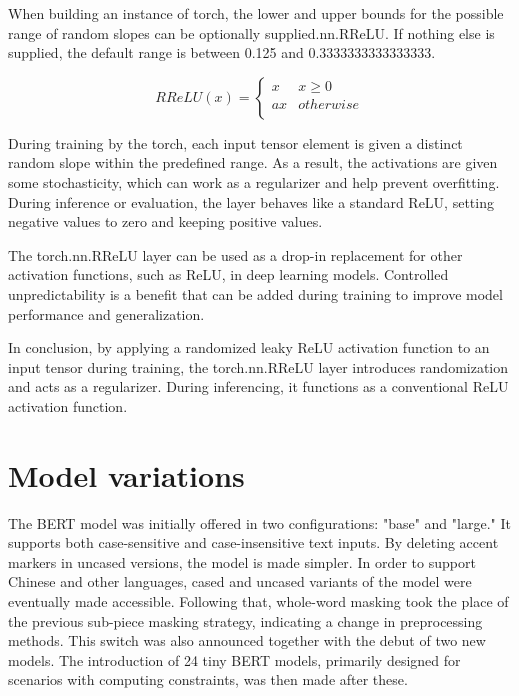 When building an instance of torch, the lower and upper bounds for the possible range of random slopes can be optionally supplied.nn.RReLU. If nothing else is supplied, the default range is between 0.125 and 0.3333333333333333.


\begin{equation}
RReLU(x) =\begin{cases} 
          x & x\geq 0 \\
          ax & otherwise\\
       \end{cases}
\end{equation}

During training by the torch, each input tensor element is given a distinct random slope within the predefined range. As a result, the activations are given some stochasticity, which can work as a regularizer and help prevent overfitting. During inference or evaluation, the layer behaves like a standard ReLU, setting negative values to zero and keeping positive values.

The torch.nn.RReLU layer can be used as a drop-in replacement for other activation functions, such as ReLU, in deep learning models. Controlled unpredictability is a benefit that can be added during training to improve model performance and generalization.

In conclusion, by applying a randomized leaky ReLU activation function to an input tensor during training, the torch.nn.RReLU layer introduces randomization and acts as a regularizer. During inferencing, it functions as a conventional ReLU activation function.



\section{Model variations}

The BERT model was initially offered in two configurations: "base" and "large." It supports both case-sensitive and case-insensitive text inputs. By deleting accent markers in uncased versions, the model is made simpler. In order to support Chinese and other languages, cased and uncased variants of the model were eventually made accessible. Following that, whole-word masking took the place of the previous sub-piece masking strategy, indicating a change in preprocessing methods. This switch was also announced together with the debut of two new models. The introduction of 24 tiny BERT models, primarily designed for scenarios with computing constraints, was then made after these.

